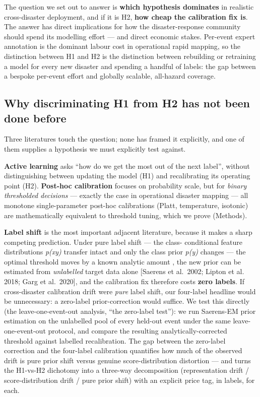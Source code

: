 The question we set out to answer is \textbf{which hypothesis dominates} in
realistic cross-disaster deployment, and if it is H2, \textbf{how cheap the
calibration fix is}. The answer has direct implications for how the
disaster-response community should spend its modelling effort --- and
direct economic stakes. Per-event expert annotation is the dominant
labour cost in operational rapid mapping, so the distinction between H1
and H2 is the distinction between rebuilding or retraining a model for
every new disaster and spending a handful of labels: the gap between a
bespoke per-event effort and globally scalable, all-hazard coverage.

\subsection{Why discriminating H1 from H2 has not been done before}\label{why-discriminating-h1-from-h2-has-not-been-done-before}

Three literatures touch the question; none has framed it explicitly,
and one of them supplies a hypothesis we must explicitly test against.

\textbf{Active learning} \cite{sener2018coreset,gal2017dropout} asks ``how do we get the most
out of the next label'', without distinguishing between updating the
model (H1) and recalibrating its operating point (H2). \textbf{Post-hoc
calibration} \cite{guo2017calibration,platt1999probabilistic,zadrozny2002isotonic} focuses on
probability scale, but for \emph{binary thresholded decisions} --- exactly the
case in operational disaster mapping --- all monotone single-parameter
post-hoc calibrations (Platt, temperature, isotonic) are mathematically
equivalent to threshold tuning, which we prove (Methods).

\textbf{Label shift} is the most important adjacent literature, because it
makes a sharp competing prediction. Under pure label shift --- the class-
conditional feature distributions \emph{p(x\textbar y)} transfer intact and only the
class prior \emph{p(y)} changes --- the optimal threshold moves by a known
analytic amount \cite{elkan2001foundations}, the new prior can be estimated from
\emph{unlabelled} target data alone {[}Saerens et al.~2002; Lipton et al.
2018; Garg et al.~2020{]}, and the calibration fix therefore costs
\textbf{zero labels}. If cross-disaster calibration drift were \emph{pure} label
shift, our four-label headline would be unnecessary: a zero-label
prior-correction would suffice. We test this directly (the leave-one-event-out analysis, ``the
zero-label test''): we run Saerens-EM prior estimation on the unlabelled
pool of every held-out event under the same leave-one-event-out
protocol, and compare the resulting analytically-corrected threshold
against labelled recalibration. The gap between the zero-label
correction and the four-label calibration quantifies how much of the
observed drift is pure prior shift versus genuine score-distribution
distortion --- and turns the H1-vs-H2 dichotomy into a three-way
decomposition (representation drift / score-distribution drift / pure
prior shift) with an explicit price tag, in labels, for each.

